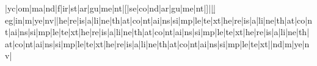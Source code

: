 \m|yc|om|ma|nd|{f|ir|st|ar|gu|me|nt|}[|se|co|nd|ar|gu|me|nt|]||\b|eg|in|{m|ye|nv|}|he|re|is|a|li|ne|th|at|co|nt|ai|ns|si|mp|le|te|xt|he|re|is|a|li|ne|th|at|co|nt|ai|ns|si|mp|le|te|xt|he|re|is|a|li|ne|th|at|co|nt|ai|ns|si|mp|le|te|xt|he|re|is|a|li|ne|th|at|co|nt|ai|ns|si|mp|le|te|xt|he|re|is|a|li|ne|th|at|co|nt|ai|ns|si|mp|le|te|xt|\e|nd|{m|ye|nv|}
